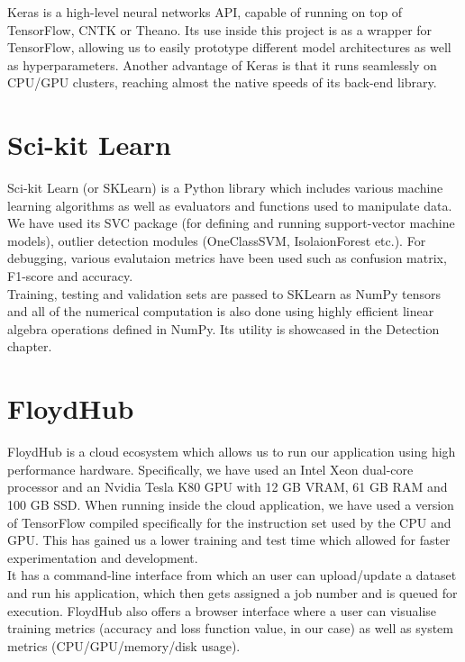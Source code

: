 \begin{appendix}
Keras\cite{KerasDocs} is a high-level neural networks API, capable of running on top of TensorFlow, CNTK or Theano. Its use inside this project is as a wrapper for TensorFlow, allowing us to easily prototype different model architectures as well as hyperparameters. Another advantage of Keras is that it runs seamlessly on CPU/GPU clusters, reaching almost the native speeds of its back-end library.

\section{Sci-kit Learn}
Sci-kit Learn (or SKLearn)\cite{SKLearn} is a Python library which includes various machine learning algorithms as well as evaluators and functions used to manipulate data. We have used its SVC package (for defining and running support-vector machine models), outlier detection modules (OneClassSVM, IsolaionForest etc.). For debugging, various evalutaion metrics have been used such as confusion matrix, F1-score and accuracy.\\
Training, testing and validation sets are passed to SKLearn as NumPy tensors and all of the numerical computation is also done using highly efficient linear algebra operations defined in NumPy.
Its utility is showcased in the Detection chapter.

\section{FloydHub}
FloydHub\cite{FloydHub} is a cloud ecosystem which allows us to run our application using high performance hardware. Specifically, we have used an Intel Xeon\textsuperscript{\tiny\textregistered} dual-core processor and an Nvidia\textsuperscript{\tiny\textcopyright}  Tesla K80 GPU with 12 GB VRAM, 61 GB RAM and 100 GB SSD. When running inside the cloud application, we have used a version of TensorFlow compiled specifically for the instruction set used by the CPU and GPU. This has gained us a lower training and test time which allowed for faster experimentation and development. \\
It has a command-line interface from which an user can upload/update a dataset and run his application, which then gets assigned a job number and is queued for execution. FloydHub also offers a browser interface where a user can visualise training metrics (accuracy and loss function value, in our case) as well as system metrics (CPU/GPU/memory/disk usage).
\end{appendix}